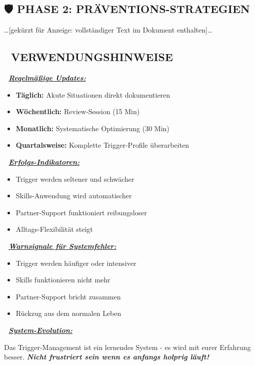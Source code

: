 \hypertarget{phase-2-pruxe4ventions-strategien}{%
\subsection{\texorpdfstring{🛡️ \textbf{PHASE 2: PRÄVENTIONS-STRATEGIEN}}{🛡️ PHASE 2: PRÄVENTIONS-STRATEGIEN}}\label{phase-2-pruxe4ventions-strategien}}

\ldots{[}gekürzt für Anzeige: vollständiger Text im Dokument enthalten{]}\ldots{}

\hypertarget{verwendungshinweise}{%
\subsection{\texorpdfstring{📝 \textbf{VERWENDUNGSHINWEISE}}{📝 VERWENDUNGSHINWEISE}}\label{verwendungshinweise}}

\textbf{📅 \emph{\ul{Regelmäßige Updates:}}}

\begin{itemize}
\tightlist
\item
  \textbf{Täglich:} Akute Situationen direkt dokumentieren
\item
  \textbf{Wöchentlich:} Review-Session (15 Min)
\item
  \textbf{Monatlich:} Systematische Optimierung (30 Min)
\item
  \textbf{Quartalsweise:} Komplette Trigger-Profile überarbeiten
\end{itemize}

\textbf{🎯 \emph{\ul{Erfolgs-Indikatoren:}}}

\begin{itemize}
\tightlist
\item
  Trigger werden seltener und schwächer
\item
  Skills-Anwendung wird automatischer
\item
  Partner-Support funktioniert reibungsloser
\item
  Alltags-Flexibilität steigt
\end{itemize}

\textbf{🚨 \emph{\ul{Warnsignale für Systemfehler:}}}

\begin{itemize}
\tightlist
\item
  Trigger werden häufiger oder intensiver
\item
  Skills funktionieren nicht mehr
\item
  Partner-Support bricht zusammen
\item
  Rückzug aus dem normalen Leben
\end{itemize}

\textbf{🔄 \emph{\ul{System-Evolution:}}}

Das Trigger-Management ist ein lernendes System - es wird mit eurer Erfahrung besser. \emph{\textbf{Nicht frustriert sein wenn es anfangs holprig läuft!}}


